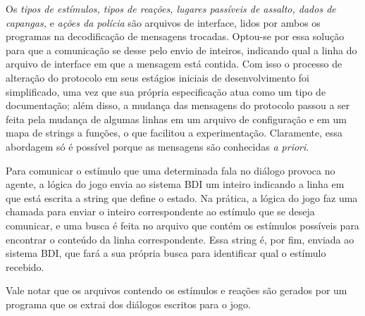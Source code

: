 Os \emph{tipos de estímulos, tipos de reações, lugares passíveis de assalto, dados de capangas,} e \emph{ações da polícia} são arquivos de interface, lidos por ambos os programas na decodificação de mensagens trocadas. Optou-se por essa solução para que a comunicação se desse pelo envio de inteiros, indicando qual a linha do arquivo de interface
em que a mensagem está contida. Com isso o processo de alteração do protocolo em seus estágios iniciais de desenvolvimento foi simplificado, uma vez que sua própria especificação atua como um tipo de documentação; além disso, a mudança das mensagens do protocolo passou a ser feita pela mudança de algumas linhas em um arquivo de configuração e em um mapa de strings a funções, o que facilitou a experimentação. Claramente, essa abordagem só é
possível porque as mensagens são conhecidas \emph{a priori}.

Para comunicar o estímulo que uma determinada fala no diálogo provoca
no agente, a lógica do jogo envia ao sistema BDI um inteiro indicando
a linha em que está escrita a string que define o estado. Na prática,
a lógica do jogo faz uma chamada para enviar o inteiro correspondente
ao estímulo que se deseja comunicar, e uma busca é feita no arquivo
que contém os estímulos possíveis para encontrar o conteúdo da linha
correspondente. Essa string é, por fim, enviada ao sistema BDI, que
fará a sua própria busca para identificar qual o estímulo recebido.

Vale notar que os arquivos contendo os estímulos e reações são gerados por um programa que os extrai dos diálogos escritos para o jogo.



